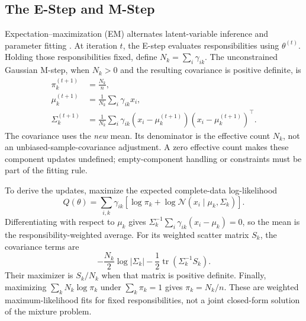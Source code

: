 \par\addvspace{\intextsep}\noindent\begin{minipage}{\linewidth}
\centering
{}
\label{fig:gmm-responsibilities}
\end{minipage}\par\addvspace{\intextsep}

\subsection{The E-Step and M-Step}

Expectation--maximization (EM) alternates latent-variable inference and parameter fitting \citep{dempster1977em}. At iteration $t$, the E-step evaluates responsibilities using $\theta^{(t)}$. Holding those responsibilities fixed, define $N_k=\sum_i\gamma_{ik}$. The unconstrained Gaussian M-step, when $N_k>0$ and the resulting covariance is positive definite, is
\begin{align*}
\pi_k^{(t+1)}&=\frac{N_k}{n},\\
\mu_k^{(t+1)}&=\frac1{N_k}\sum_i\gamma_{ik}x_i,\\
\Sigma_k^{(t+1)}&=\frac1{N_k}\sum_i\gamma_{ik}
(x_i-\mu_k^{(t+1)})(x_i-\mu_k^{(t+1)})^\top.
\end{align*}
The covariance uses the \emph{new} mean. Its denominator is the effective count $N_k$, not an unbiased-sample-covariance adjustment. A zero effective count makes these component updates undefined; empty-component handling or constraints must be part of the fitting rule.

To derive the updates, maximize the expected complete-data log-likelihood
\[
Q(\theta)=\sum_{i,k}\gamma_{ik}
\left[\log\pi_k+\log\mathcal N(x_i\mid\mu_k,\Sigma_k)\right].
\]
Differentiating with respect to $\mu_k$ gives $\Sigma_k^{-1}\sum_i\gamma_{ik}(x_i-\mu_k)=0$, so the mean is the responsibility-weighted average. For its weighted scatter matrix $S_k$, the covariance terms are
\[
-\frac{N_k}{2}\log|\Sigma_k|
-\frac12\operatorname{tr}(\Sigma_k^{-1}S_k).
\]
Their maximizer is $S_k/N_k$ when that matrix is positive definite. Finally, maximizing $\sum_kN_k\log\pi_k$ under $\sum_k\pi_k=1$ gives $\pi_k=N_k/n$. These are weighted maximum-likelihood fits for fixed responsibilities, not a joint closed-form solution of the mixture problem.

